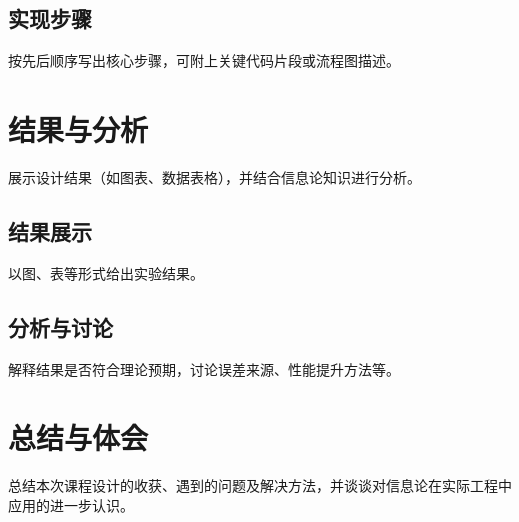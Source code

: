 \documentclass[12pt,a4paper]{ctexart}
\begin{document}
	\subsection{实现步骤}
	按先后顺序写出核心步骤，可附上关键代码片段或流程图描述。
	
	\section{结果与分析}
	
	展示设计结果（如图表、数据表格），并结合信息论知识进行分析。
	
	\subsection{结果展示}
	以图、表等形式给出实验结果。
	
	\subsection{分析与讨论}
	解释结果是否符合理论预期，讨论误差来源、性能提升方法等。
	
	\section{总结与体会}
	
	总结本次课程设计的收获、遇到的问题及解决方法，并谈谈对信息论在实际工程中应用的进一步认识。
	
\end{document}
